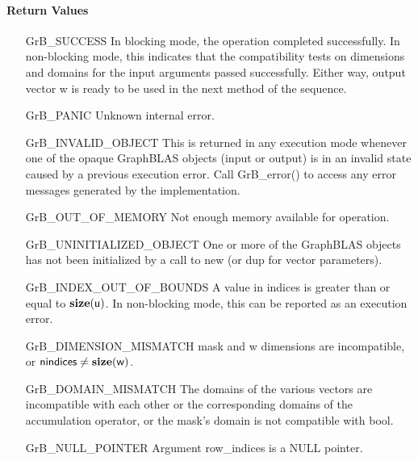 \paragraph{Return Values}

\begin{itemize}[leftmargin=2.1in]
    \item[{\sf GrB\_SUCCESS}]         In blocking mode, the operation completed
    successfully. In non-blocking mode, this indicates that the compatibility 
    tests on dimensions and domains for the input arguments passed successfully. 
    Either way, output vector {\sf w} is ready to be used in the next method of 
    the sequence.

    \item[{\sf GrB\_PANIC}]            Unknown internal error.
    
    \item[{\sf GrB\_INVALID\_OBJECT}] This is returned in any execution mode 
    whenever one of the opaque GraphBLAS objects (input or output) is in an invalid 
    state caused by a previous execution error.  Call {\sf GrB\_error()} to access 
    any error messages generated by the implementation.

    \item[{\sf GrB\_OUT\_OF\_MEMORY}]  Not enough memory available for operation.
    
    \item[{\sf GrB\_UNINITIALIZED\_OBJECT}] One or more of the GraphBLAS objects 
    has not been initialized by a call to {\sf new} (or {\sf dup} for vector
    parameters).

    \item[{\sf GrB\_INDEX\_OUT\_OF\_BOUNDS}]  A value in {\sf indices} is greater 
    than or equal to $\bold{size}({\sf u})$.  In non-blocking mode, this can be
    reported as an execution error.
    
    \item[{\sf GrB\_DIMENSION\_MISMATCH}]  {\sf mask} and {\sf w} dimensions are
    incompatible, or ${\sf nindices} \neq \bold{size}({\sf w})$. 
    
    \item[{\sf GrB\_DOMAIN\_MISMATCH}]    The domains of the various vectors are
	incompatible with each other or the corresponding domains of the 
    accumulation operator, or the mask's domain is not compatible with {\sf bool}.

    \item[{\sf GrB\_NULL\_POINTER}] Argument {\sf row\_indices} is a {\sf NULL} pointer.
\end{itemize}

